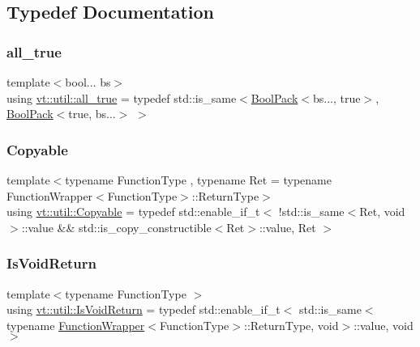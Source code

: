 \subsection{Typedef Documentation}
\mbox{\label{namespacevt_1_1util_a3169b1fa334a1e8fa2326b8db648e446}} 
\subsubsection{\texorpdfstring{all\+\_\+true}{all\_true}}
{\footnotesize\ttfamily template$<$bool... bs$>$ \\
using \hyperlink{namespacevt_1_1util_a3169b1fa334a1e8fa2326b8db648e446}{vt\+::util\+::all\+\_\+true} = typedef std\+::is\+\_\+same$<$\hyperlink{structvt_1_1util_1_1_bool_pack}{Bool\+Pack}$<$bs..., true$>$, \hyperlink{structvt_1_1util_1_1_bool_pack}{Bool\+Pack}$<$true, bs...$>$ $>$}

\mbox{\label{namespacevt_1_1util_ae9a553985cdc8e9bd4e55f55161f2929}} 
\subsubsection{\texorpdfstring{Copyable}{Copyable}}
{\footnotesize\ttfamily template$<$typename Function\+Type , typename Ret  = typename Function\+Wrapper$<$\+Function\+Type$>$\+::\+Return\+Type$>$ \\
using \hyperlink{namespacevt_1_1util_ae9a553985cdc8e9bd4e55f55161f2929}{vt\+::util\+::\+Copyable} = typedef std\+::enable\+\_\+if\+\_\+t$<$ !std\+::is\+\_\+same$<$Ret, void$>$\+::value \&\& std\+::is\+\_\+copy\+\_\+constructible$<$Ret$>$\+::value, Ret $>$}

\mbox{\label{namespacevt_1_1util_a97df3e28837417537b3bc035c74f064d}} 
\subsubsection{\texorpdfstring{Is\+Void\+Return}{IsVoidReturn}}
{\footnotesize\ttfamily template$<$typename Function\+Type $>$ \\
using \hyperlink{namespacevt_1_1util_a97df3e28837417537b3bc035c74f064d}{vt\+::util\+::\+Is\+Void\+Return} = typedef std\+::enable\+\_\+if\+\_\+t$<$ std\+::is\+\_\+same$<$ typename \hyperlink{structvt_1_1util_1_1_function_wrapper}{Function\+Wrapper}$<$Function\+Type$>$\+::Return\+Type, void$>$\+::value, void $>$}

